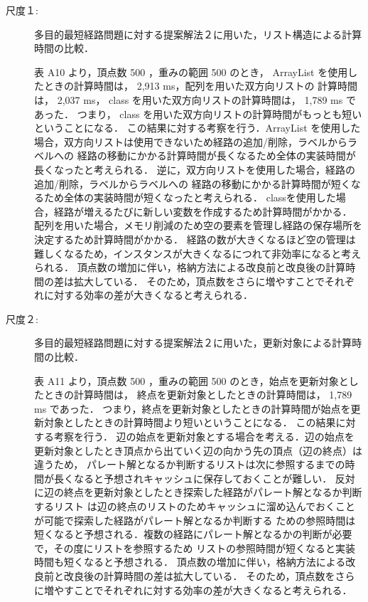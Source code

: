 \documentclass[12pt]{optlab-bachelor}
\begin{document}
\begin{description}
  \item[尺度１:]
  多目的最短経路問題に対する提案解法２に用いた，リスト構造による計算時間の比較．

  表 A10 より，頂点数 500 ，重みの範囲 500 のとき， ArrayList を使用したときの計算時間は， 2,913 ms，配列を用いた双方向リストの
  計算時間は， 2,037 ms， class を用いた双方向リストの計算時間は， 1,789 ms であった．
  つまり， class を用いた双方向リストの計算時間がもっとも短いということになる．
  この結果に対する考察を行う．ArrayList を使用した場合，双方向リストは使用できないため経路の追加/削除，ラベルからラベルへの
  経路の移動にかかる計算時間が長くなるため全体の実装時間が長くなったと考えられる．
  逆に，双方向リストを使用した場合，経路の追加/削除，ラベルからラベルへの
  経路の移動にかかる計算時間が短くなるため全体の実装時間が短くなったと考えられる．
  classを使用した場合，経路が増えるたびに新しい変数を作成するため計算時間がかかる．
  配列を用いた場合，メモリ削減のため空の要素を管理し経路の保存場所を決定するため計算時間がかかる．
  経路の数が大きくなるほど空の管理は難しくなるため，インスタンスが大きくなるにつれて非効率になると考えられる．
  頂点数の増加に伴い，格納方法による改良前と改良後の計算時間の差は拡大している．
  そのため，頂点数をさらに増やすことでそれぞれに対する効率の差が大きくなると考えられる．

\end{description}

\begin{description}
  \item[尺度２:]
  多目的最短経路問題に対する提案解法２に用いた，更新対象による計算時間の比較．

  表 A11 より，頂点数 500 ，重みの範囲 500 のとき，始点を更新対象としたときの計算時間は，
  終点を更新対象としたときの計算時間は， 1,789 ms であった．
  つまり，終点を更新対象としたときの計算時間が始点を更新対象としたときの計算時間より短いということになる．
  この結果に対する考察を行う．
  辺の始点を更新対象とする場合を考える．辺の始点を更新対象としたとき頂点から出ていく辺の向かう先の頂点（辺の終点）は違うため，
  パレート解となるか判断するリストは次に参照するまでの時間が長くなると予想されキャッシュに保存しておくことが難しい．
  反対に辺の終点を更新対象としたとき探索した経路がパレート解となるか判断するリスト
  は辺の終点のリストのためキャッシュに溜め込んでおくことが可能で探索した経路がパレート解となるか判断する
  ための参照時間は短くなると予想される．複数の経路にパレート解となるかの判断が必要で，その度にリストを参照するため
  リストの参照時間が短くなると実装時間も短くなると予想される．
  頂点数の増加に伴い，格納方法による改良前と改良後の計算時間の差は拡大している．
  そのため，頂点数をさらに増やすことでそれぞれに対する効率の差が大きくなると考えられる．

\end{description}
\end{document}
